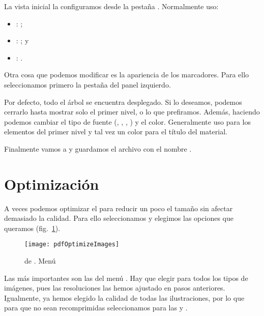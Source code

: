 \documentclass[%
	a5paper,
	10pt,
	twoside,
	openright,
	final,
]{memoir}
\begin{document}
{	La vista inicial la configuramos desde la pestaña . Normalmente uso:
	\begin{itemize}[noitemsep]
		\item {}: ;
		\item {}: ; y
		\item {}: .
	\end{itemize}

	Otra cosa que podemos modificar es la apariencia de los marcadores. Para ello seleccionamos primero la pestaña  del panel izquierdo.

	Por defecto, todo el árbol se encuentra desplegado. Si lo deseamos, podemos cerrarlo hasta mostrar solo el primer nivel, o lo que prefiramos. Además, haciendo  podemos cambiar el tipo de fuente (, , , ) y el color. Generalmente uso  para los elementos del primer nivel y tal vez un color para el título del material.

	Finalmente vamos a  y guardamos el archivo con el nombre .

	\section{Optimización\label{sec:pdfOptimize}} A veces podemos optimizar el \pdf para reducir un poco el tamaño sin afectar demasiado la calidad. Para ello seleccionamos  y elegimos las opciones que queramos (fig.~\ref{fig:pdfOptimizeImages}).

	\begin{figure}
		\texttt{[image: pdfOptimizeImages]}
		\caption[\texttt{PDF Optimizer} de \acrobat.]{ de \acrobat. Menú \label{fig:pdfOptimizeImages}}
	\end{figure}

	Las más importantes son las del menú . Hay que elegir  para todos los tipos de imágenes, pues las resoluciones las hemos ajustado en pasos anteriores. Igualmente, ya hemos elegido la calidad de todas las ilustraciones, por lo que para que no sean recomprimidas seleccionamos  para las  y .

}
\end{document}
